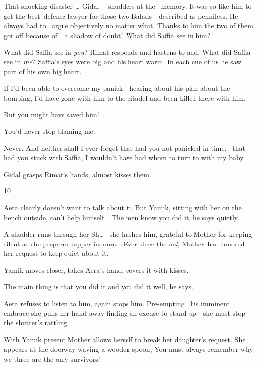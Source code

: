 \documentclass[12pt]{book}
\begin{document}
{\textquotedbl}That shocking disaster {\dots}{\textquotedbl} Gidal{ \ \ }shudders at the
{\ }memory. {\textquotedbl}It was so like him to get the best~defense lawyer for those two Balads -
described as penniless. He always had to \ argue objectively no matter what. Thanks to him the two of them got off
because of \ {}'a shadow of doubt'. What did Saffia see in him?{\textquotedbl}

{\textquotedbl}What did Saffia see in \textit{you}?{\textquotedbl} Rimat responds and hastens to add,
{\textquotedbl}What did Saffia see in \textit{me}? Saffia's eyes were big and his heart warm. In each one of us he saw
part of his own{ big heart}.

{\textquotedbl}If I'd been able to overcome my panick - hearing about his plan about the bombing, I'd have gone with him
to the citadel and been killed there with him.{\textquotedbl}

{\textquotedbl}But you might have saved him!{\textquotedbl}

{\textquotedbl}You'd never stop blaming me.{\textquotedbl}

{\textquotedbl}Never. And neither shall I ever forget that had you not panicked in time, {\ }that had you
stuck with Saffia, I wouldn't have had whom to turn to with my baby.{\textquotedbl}

Gidal grasps Rimat's hands, almost kisses them. ~


\bigskip

10

Aera clearly doesn't want to talk about it. But Yamik, sitting with her on the bench outside, can't help himself.
\ {\textquotedbl}The men know you did it,{\textquotedbl} he says quietly.

A shudder runs through her {\textquotedbl}Sh{\dots}{\textquotedbl} \ she hushes him, grateful to Mother for keeping
silent as she prepares supper indoors.~ Ever since the \textit{act}, Mother~has honored her request to keep quiet about
it.

Yamik moves closer, takes Aera's hand, covers it with kisses.

{\textquotedbl}The main thing is that you did it and you did it well,{\textquotedbl} he says.

Aera refuses to listen to him, again stops him. Pre-empting{ }\ his imminent embrace she pulls her hand
away finding an excuse to stand up - she must stop the shutter's rattling.

With Yamik present Mother allows herself to break her daughter's request. She appears at the doorway waving a wooden
spoon, {\textquotedbl}You must always remember why we three are the only survivors!{\textquotedbl}
\end{document}
